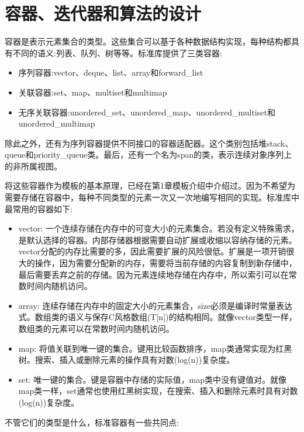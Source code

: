 \section{容器、迭代器和算法的设计}
容器是表示元素集合的类型。这些集合可以基于各种数据结构实现，每种结构都具有不同的语义:列表、队列、树等等。标准库提供了三类容器:

\begin{itemize}
\item
序列容器:vector、deque、list、array和forward\_list

\item
关联容器:set、map、multiset和multimap

\item
无序关联容器:unordered\_set、unordered\_map、unordered\_multiset和unordered\_multimap
\end{itemize}

除此之外，还有为序列容器提供不同接口的容器适配器。这个类别包括堆stack、queue和priority\_queue类。最后，还有一个名为span的类，表示连续对象序列上的非所属视图。

将这些容器作为模板的基本原理，已经在第1章模板介绍中介绍过。因为不希望为需要存储在容器中，每种不同类型的元素一次又一次地编写相同的实现。标准库中最常用的容器如下:

\begin{itemize}
\item
vector: 一个连续存储在内存中的可变大小的元素集合。若没有定义特殊需求，是默认选择的容器。内部存储器根据需要自动扩展或收缩以容纳存储的元素。vector分配的内存比需要的多，因此需要扩展的风险很低。扩展是一项开销很大的操作，因为需要分配新的内存，需要将当前存储的内容复制到新存储中，最后需要丢弃之前的存储。因为元素连续地存储在内存中，所以索引可以在常数时间内随机访问。

\item
array: 连续存储在内存中的固定大小的元素集合，size必须是编译时常量表达式。数组类的语义与保存C风格数组(T[n])的结构相同。就像vector类型一样，数组类的元素可以在常数时间内随机访问。

\item
map: 将值关联到唯一键的集合。键用比较函数排序，map类通常实现为红黑树。搜索、插入或删除元素的操作具有对数(log(n))复杂度。

\item
set: 唯一键的集合。键是容器中存储的实际值，map类中没有键值对。就像map类一样，set通常也使用红黑树实现，在搜索、插入和删除元素时具有对数(log(n))复杂度。
\end{itemize}

不管它们的类型是什么，标准容器有一些共同点:

